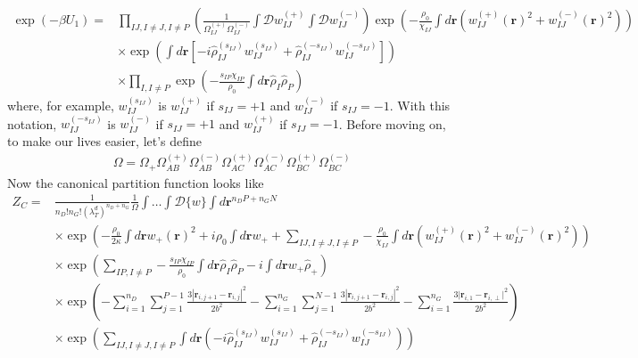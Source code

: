 \documentclass{article}
\begin{document}
\begin{align*}
  \exp (-\beta U_1) =&
    \prod_{IJ, I \ne J, I \ne P} \left(
      \frac{1}{\Omega_{IJ}^{(+)}\Omega_{IJ}^{(-)}}
      \int \mathcal{D} w_{IJ}^{(+)} \int \mathcal{D} w_{IJ}^{(-)}
    \right)
    \exp \left(
      -\frac{\rho_0}{\chi_{IJ}}
      \int d \mathbf{r} \left( 
        w_{IJ}^{(+)}(\mathbf{r})^2 + w_{IJ}^{(-)}(\mathbf{r})^2
      \right)
    \right) \\
    &\times
    \exp \left(
      \int d \mathbf{r} \left[ 
        - i \hat{\rho}_{IJ}^{(s_{IJ})} w_{IJ}^{(s_{IJ})}
        + \hat{\rho}_{IJ}^{(-s_{IJ})} w_{IJ}^{(-s_{IJ})}
      \right]
    \right) \\
    &\times
    \prod_{I, I \ne P} \exp \left(
      - \frac{s_{IP}\chi_{IP}}{\rho_0}
      \int d \mathbf{r} \hat{\rho}_I \hat{\rho}_P
    \right)
\end{align*}
where, for example, $w_{IJ}^{(s_{IJ})}$ is $w_{IJ}^{(+)}$ if $s_{IJ} = +1$ and
  $w_{IJ}^{(-)}$ if $s_{IJ} = -1$.
With this notation, $w_{IJ}^{(-s_{IJ})}$ is $w_{IJ}^{(-)}$ if $s_{IJ} = +1$ and
  $w_{IJ}^{(+)}$ if $s_{IJ} = -1$.
Before moving on, to make our lives easier, let's define
\begin{align*}
  \Omega =
    \Omega_+
    \Omega_{AB}^{(+)} \Omega_{AB}^{(-)}
    \Omega_{AC}^{(+)} \Omega_{AC}^{(-)}
    \Omega_{BC}^{(+)} \Omega_{BC}^{(-)}
\end{align*}
Now the canonical partition function looks like
\begin{align*}
  Z_C =& \frac{1}{n_D!n_G! \left( \lambda_T^d \right)^{n_D+n_G}}
    \frac{1}{\Omega}
    \int \hdots \int \mathcal{D} \{w\}
    \int d \mathbf{r}^{n_D P + n_G N} \\
    &\times
    \exp \left(
      - \frac{\rho_0}{2\kappa} \int d \mathbf{r} w_+(\mathbf{r})^2
      + i \rho_0 \int d\mathbf{r} w_+
      + \sum_{IJ,I \ne J, I \ne P}
      - \frac{\rho_0}{\chi_{IJ}}
      \int d \mathbf{r}
      \left(
        w_{IJ}^{(+)} (\mathbf{r})^2 + w_{IJ}^{(-)} (\mathbf{r})^2
      \right)
    \right) \\
    &\times
    \exp \left(
      \sum_{IP,I \ne P}
      - \frac{s_{IP}\chi_{IP}}{\rho_0}
      \int d \mathbf{r} \hat{\rho}_I \hat{\rho}_P
      - i\int d \mathbf{r} w_+ \hat{\rho}_+
    \right) \\
    &\times
    \exp \left(
      - \sum_{i=1}^{n_D} \sum_{j=1}^{P-1}
      \frac{3 \left| \mathbf{r}_{i,j+1} - \mathbf{r}_{i,j} \right| ^ 2 }
           { 2 b^2 }
      - \sum_{i=1}^{n_G} \sum_{j=1}^{N-1}
      \frac{3 \left| \mathbf{r}_{i,j+1} - \mathbf{r}_{i,j} \right| ^ 2 }
           { 2 b^2 } 
      -
      \sum_{i=1}^{n_G}  \frac{3\vert \mathbf{r}_{i,1} - \mathbf{r}_{i,\perp} \vert^2} %
      {2b^2}  %
    \right) \\
    &\times
    \exp \left(
      \sum_{IJ, I \ne J, I \ne P}
      \int d \mathbf{r} \left(
        -i \hat{\rho}_{IJ}^{(s_{IJ})} w_{IJ}^{(s_{IJ})}
        + \hat{\rho}_{IJ}^{(-s_{IJ})} w_{IJ}^{(-s_{IJ})}
      \right)
    \right)
\end{align*}
\end{document}
